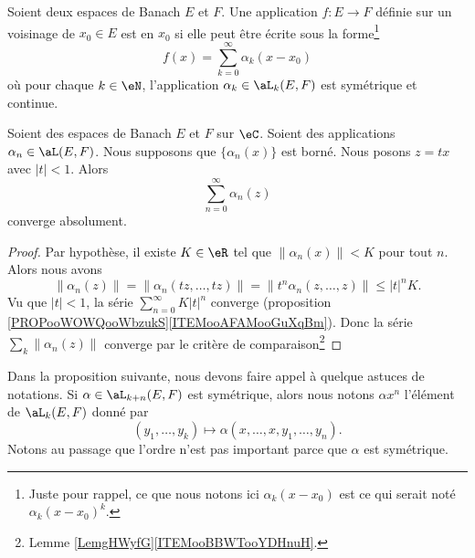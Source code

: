 \begin{definition}	\label{DEFooAIHMooKbWsBt}
	Soient deux espaces de Banach \( E\) et \( F\). Une application \(f \colon E\to F  \) définie sur un voisinage de \( x_0\in E\) est  en \( x_0\) si elle peut être écrite sous la forme\footnote{Juste pour rappel, ce que nous notons ici \( \alpha_k(x-x_0)\) est ce qui serait noté \( \alpha_k(x-x_0)^k\).}
	\begin{equation}
		f(x)=\sum_{k=0}^{\infty}\alpha_k(x-x_0)
	\end{equation}
	où pour chaque \( k\in \eN\), l'application \( \alpha_k\in\aL_k(E,F)\) est symétrique et continue.
\end{definition}


\begin{theorem}	\label{THOooNBNFooMsAorH}
	Soient des espaces de Banach \( E\) et \( F\) sur \( \eC\). Soient des applications \( \alpha_n\in\aL(E,F)\). Nous supposons que \( \{ \alpha_n(x) \}\) est borné. Nous posons \( z=tx\) avec \( | t |<1\). Alors
	\begin{equation}
		\sum_{n=0}^{\infty}\alpha_n(z)
	\end{equation}
	converge absolument.
\end{theorem}

\begin{proof}
	Par hypothèse, il existe \( K\in\eR\) tel que \( \| \alpha_n(x) \|<K\) pour tout \( n\). Alors nous avons
	\begin{equation}
		\| \alpha_n(z) \|=\| \alpha_n(tz,\ldots,tz) \|=\| t^n\alpha_n(z,\ldots,z) \|\leq | t |^nK.
	\end{equation}
	Vu que \( | t |<1\), la série \( \sum_{n=0}^{\infty}K| t |^n\) converge (proposition \ref{PROPooWOWQooWbzukS}\ref{ITEMooAFAMooGuXqBm}). Donc la série \( \sum_k\| \alpha_n(z) \|\) converge par le critère de comparaison\footnote{Lemme \ref{LemgHWyfG}\ref{ITEMooBBWTooYDHnuH}.}
\end{proof}

\begin{normaltext}		\label{NORMooQDCKooXHtrHQ}
	Dans la proposition suivante, nous devons faire appel à quelque astuces de notations. Si \( \alpha\in \aL_{k+n}(E,F)\) est symétrique, alors nous notons \( \alpha x^n\) l'élément de \(\aL_k(E,F) \) donné par
	\begin{equation}
		(y_1,\ldots,y_k)\mapsto \alpha(x,\ldots,x,y_1,\ldots,y_n).
	\end{equation}
	Notons au passage que l'ordre n'est pas important parce que \( \alpha\) est symétrique.
\end{normaltext}


